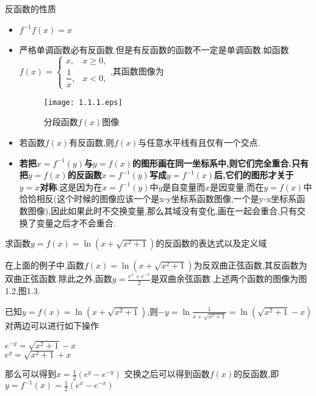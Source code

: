 \documentclass[12pt, a4paper, oneside, UTF8]{ctexbook}  %
\begin{document}
\begin{defn}{反函数的性质}{}
    \begin{itemize}
        \item $f^{-1}f(x)=x$
        \item 严格单调函数必有反函数,但是有反函数的函数不一定是单调函数.如函数$f(x)=\begin{cases}x,&x\geqslant0, \\ \dfrac{1}{x},&x<0,\end{cases}$,其函数图像为
              \begin{figure}[H]
                  \centering \texttt{[image: 1.1.1.eps]} \caption{分段函数$f(x)$图像}
                  \label{xxx1}
              \end{figure}
        \item 若函数$f(x)$有反函数,则$f(x)$与任意水平线有且仅有一个交点.
        \item \textbf{若把$x=f^{-1}(y)$与$y=f(x)$的图形画在同一坐标系中,则它们完全重合.只有把$y=f(x)$的反函数$x=f^{-1}(y)$写成$y=f^{-1}(x)$后,它们的图形才关于 $y=x$对称}.这是因为在$x=f^{-1}(y)$中$y$是自变量而$x$是因变量,而在$y=f(x)$中恰恰相反(这个时候的图像应该一个是x-y坐标系函数图像,一个是y-x坐标系函数图像),因此如果此时不交换变量,那么其域没有变化,画在一起会重合,只有交换了变量之后才不会重合.
    \end{itemize}
\end{defn}

\begin{problem}
求函数$y=f(x)=\ln(x+\sqrt{x^2+1})$的反函数的表达式以及定义域
\end{problem}
\begin{note}
    在上面的例子中,函数$f(x)=\ln(x+\sqrt{x^2+1})$为反双曲正弦函数,其反函数为双曲正弦函数.除此之外,函数$y=\frac{e^x+e^{-x}}{2}$是双曲余弦函数.上述两个函数的图像为图1.2,图1.3.
\end{note}
\begin{solution}
    已知$y=f(x)=\ln(x+\sqrt{x^2+1})$,则$-y=\ln \frac{1}{x+\sqrt{x^2+1}}=\ln(\sqrt{x^2+1}-x)$\\
    对两边可以进行如下操作
    \begin{center}
        $e^{-y}=\sqrt{x^2+1}-x$\\
        $e^{y}=\sqrt{x^2+1}+x$\\
    \end{center}
    那么可以得到$x=\frac{1}{2}(e^y-e^{-y})$
    交换之后可以得到函数$f(x)$的反函数,即
    $y=f^{-1}(x)=\frac{1}{2}(e^x-e^{-x})$
\end{solution}
\end{document}
